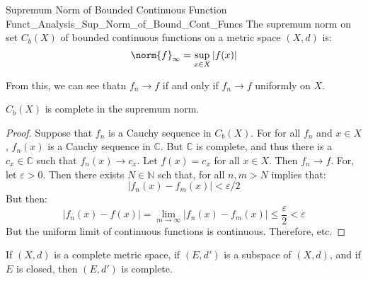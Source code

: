 \documentclass[crop=false,class=book,oneside]{standalone}                      %
\begin{document}
            \begin{ldefinition}
                  {Supremum Norm of Bounded Continuous Function}
                  {Funct_Analysis_Sup_Norm_of_Bound_Cont_Funcs}
                The supremum norm on set $C_{b}(X)$ of bounded
                continuous functions on a metric space $(X,d)$ is:
                \begin{equation}
                    \norm{f}_{\infty}=\sup_{x\in{X}}|f(x)|
                \end{equation}
            \end{ldefinition}
            From this, we can see thatn $f_{n}\rightarrow{f}$ if
            and only if $f_{n}\rightarrow{f}$ uniformly on $X$.
            \begin{theorem}
                $C_{b}(X)$ is complete in the supremum norm.
            \end{theorem}
            \begin{proof}
                Suppose that $f_{n}$ is a Cauchy sequence in
                $C_{b}(X)$. For for all $f_{n}$ and $x\in{X}$,
                $f_{n}(x)$ is a Cauchy sequence in $\mathbb{C}$.
                But $\mathbb{C}$ is complete, and thus there is a
                $c_{x}\in\mathbb{C}$ such that
                $f_{n}(x)\rightarrow{c}_{x}$. Let
                $f(x)=c_{x}$ for all $x\in{X}$. Then
                $f_{n}\rightarrow{f}$. For, let $\varepsilon>0$.
                Then there exists $N\in\mathbb{N}$ sch that, for
                all $n,m>{N}$ implies that:
                \begin{equation}
                    |f_{n}(x)-f_{m}(x)|<\varepsilon/2
                \end{equation}
                But then:
                \begin{equation}
                    |f_{n}(x)-f(x)|=
                    \underset{m\rightarrow\infty}{\lim}
                    |f_{n}(x)-f_{m}(x)|
                    \leq\frac{\varepsilon}{2}<\varepsilon
                \end{equation}
                But the uniform limit of continuous functions is
                continuous. Therefore, etc.
            \end{proof}
            \begin{theorem}
                If $(X,d)$ is a complete metric space, if
                $(E,d')$ is a subspace of $(X,d)$, and if
                $E$ is closed, then $(E,d')$ is complete.
            \end{theorem}
\end{document}
